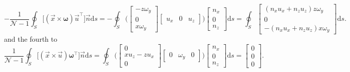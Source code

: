 \documentclass[wes, manuscript]{copernicus}
\begin{document}
\begin{equation}
-\frac{1}{\mathscr{N}-1} \oint_{S} \big[(\vec{x} \times \boldsymbol{\omega})\vec{u}^{\top}\big]\vec{n}  \textrm{d}s
= - \oint_{S}
\Bigg(
\begin{bmatrix} -z\omega_{y} \\[2pt] 0 \\[2pt] x\omega_{y} \end{bmatrix}
\begin{bmatrix} u_{x} & 0 & u_{z} \end{bmatrix} 
\Bigg)
\begin{bmatrix} n_{x} \\[2pt] 0 \\[2pt] n_{z} \end{bmatrix} \textrm{d}s
= \oint_{S}
\begin{bmatrix}
(n_{x}u_{x}+n_{z}u_{z}) z \omega_{y} \\[4pt]
0 \\[4pt]
-(n_{x}u_{x}+n_{z}u_{z}) x \omega_{y}
\end{bmatrix} \textrm{d}s .
\end{equation}
%
and the fourth to
%
\begin{equation}
\frac{1}{\mathscr{N}-1} \oint_{S} \big[(\vec{x} \times \vec{u})\boldsymbol{\omega}^{\top}\big]\vec{n}  \textrm{d}s
=   \oint_{S}
\Bigg(
\begin{bmatrix} 0 \\ x u_{{z}} - z u_{{x}} \\ 0 \end{bmatrix}
\begin{bmatrix} 0 & \omega_{y} & 0 \end{bmatrix}
\Bigg)
\begin{bmatrix} n_{{x}} \\ 0 \\ n_{{z}} \end{bmatrix} \textrm{d}s
= \begin{bmatrix} 0 \\ 0 \\ 0 \end{bmatrix} .
\end{equation}
\end{document}
